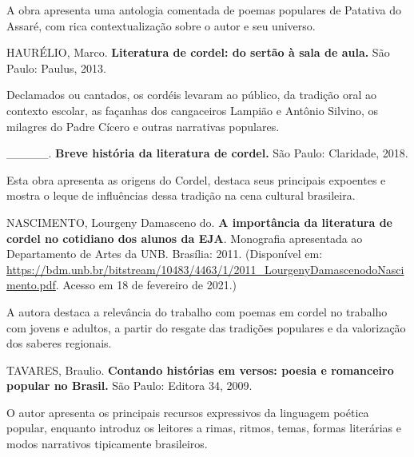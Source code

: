\documentclass[12pt]{extarticle}
\begin{document}
A obra apresenta uma antologia comentada de poemas populares de Patativa
do Assaré, com rica contextualização sobre o autor e seu universo.


  HAURÉLIO, Marco. \textbf{Literatura de cordel: do sertão à sala de
  aula.} São Paulo: Paulus, 2013.

Declamados ou cantados, os cordéis levaram ao público, da tradição oral
ao contexto escolar, as façanhas dos cangaceiros Lampião e Antônio
Silvino, os milagres do Padre Cícero e outras narrativas populares.


  \_\_\_\_\_. \textbf{Breve história da literatura de cordel.} São
  Paulo: Claridade, 2018.

Esta obra apresenta as origens do Cordel, destaca seus principais
expoentes e mostra o leque de influências dessa tradição na cena
cultural brasileira.


  NASCIMENTO, Lourgeny Damasceno do. \textbf{A importância da literatura
  de cordel no cotidiano dos alunos da EJA}. Monografia apresentada ao
  Departamento de Artes da UNB. Brasília: 2011. (Disponível em:
  \url{https://bdm.unb.br/bitstream/10483/4463/1/2011_LourgenyDamascenodoNascimento.pdf}.
  Acesso em 18 de fevereiro de 2021.)

A autora destaca a relevância do trabalho com poemas em cordel no
trabalho com jovens e adultos, a partir do resgate das tradições
populares e da valorização dos saberes regionais.


  TAVARES, Braulio. \textbf{Contando histórias em versos: poesia e
  romanceiro popular no Brasil.} São Paulo: Editora 34, 2009.

O autor apresenta os principais recursos expressivos da linguagem
poética popular, enquanto introduz os leitores a rimas, ritmos, temas,
formas literárias e modos narrativos tipicamente brasileiros.
\end{document}
